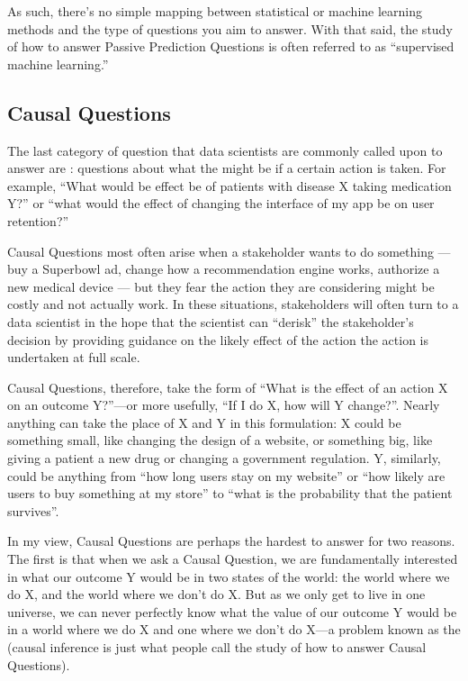 \documentclass[letterpaper,10pt,english]{jupyterBook}
\begin{document}
\sphinxAtStartPar
As such, there’s no simple mapping between statistical or machine learning methods and the type of questions you aim to answer. With that said, the study of how to answer Passive Prediction Questions is often referred to as “supervised machine learning.”


\subsection{Causal Questions}
\label{\detokenize{10_introduction/22_question_types:causal-questions}}
\sphinxAtStartPar
The last category of question that data scientists are commonly called upon to answer are : questions about what the  might be if a certain action is taken. For example, “What would be effect be of patients with disease X taking medication Y?” or “what would the effect of changing the interface of my app be on user retention?”

\sphinxAtStartPar
Causal Questions most often arise when a stakeholder wants to do something — buy a Superbowl ad, change how a recommendation engine works, authorize a new medical device — but they fear the action they are considering might be costly and not actually work. In these situations, stakeholders will often turn to a data scientist in the hope that the scientist can “de\sphinxhyphen{}risk” the stakeholder’s decision by providing guidance on the likely effect of the action  the action is undertaken at full scale.

\sphinxAtStartPar
Causal Questions, therefore, take the form of “What is the effect of an action X on an outcome Y?”—or more usefully, “If I do X, how will Y change?”. Nearly anything can take the place of X and Y in this formulation: X could be something small, like changing the design of a website, or something big, like giving a patient a new drug or changing a government regulation. Y, similarly, could be anything from “how long users stay on my website” or “how likely are users to buy something at my store” to “what is the probability that the patient survives”.

\sphinxAtStartPar
In my view, Causal Questions are perhaps the hardest to answer for two reasons. The first is that when we ask a Causal Question, we are fundamentally interested in  what our outcome Y would be in two states of the world: the world where we do X, and the world where we don’t do X. But as we only get to live in one universe, we can never perfectly know what the value of our outcome Y would be in  a world where we do X and one where we don’t do X—a problem known as the  (causal inference is just what people call the study of how to answer Causal Questions).
\end{document}
